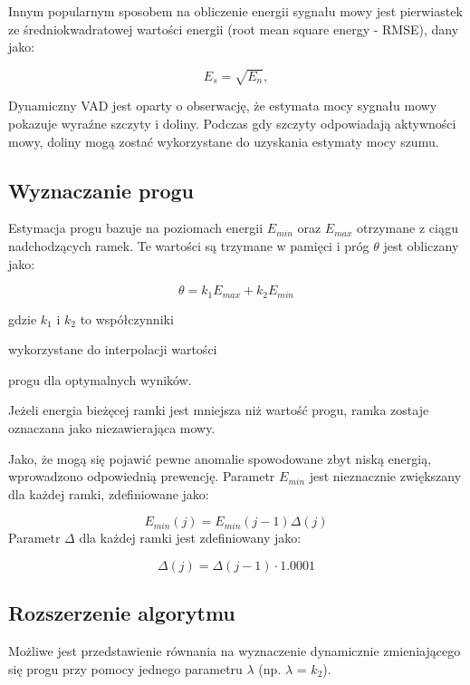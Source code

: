 \documentclass[eng,printmode]{mgr}
\begin{document}
  Innym popularnym sposobem na obliczenie energii sygnału mowy jest pierwiastek ze średniokwadratowej wartości energii (root mean square energy - RMSE), dany jako:
  
  \begin{equation}
	  E_{s} =\sqrt{E_n},
  \end{equation}
  
  Dynamiczny VAD jest oparty o obserwację, że estymata mocy sygnału mowy pokazuje wyraźne szczyty i doliny. Podczas gdy szczyty odpowiadają aktywności mowy, doliny mogą zostać wykorzystane do uzyskania estymaty mocy szumu.
  
  \subsection{Wyznaczanie progu \cite{energyAlgorithm}}
 Estymacja progu bazuje na poziomach energii $E_{min}$ oraz $E_{max}$ otrzymane z ciągu nadchodzących ramek. Te wartości są trzymane w pamięci i próg $\theta$ jest obliczany jako:
 
 \begin{equation}
	 \theta = k_{1}E_{max} + k_{2}E_{min}
 \end{equation}
 
  \hspace{8cm} gdzie $k_{1}$ i $k_{2}$ to współczynniki 
  
  \hspace{8cm}wykorzystane do interpolacji wartości
  
  \hspace{8cm} progu dla optymalnych wyników.\vspace{5mm} 
  
  Jeżeli energia bieżęcej ramki jest mniejsza niż wartość progu, ramka zostaje oznaczana jako niezawierająca mowy. 
  
  Jako, że mogą się pojawić pewne anomalie spowodowane zbyt niską energią, wprowadzono odpowiednią prewencję. Parametr $E_{min}$ jest nieznacznie zwiększany dla każdej ramki, zdefiniowane jako:
  
  \begin{equation}
  E_{min}(j) = E_{min}(j-1)\Delta(j)
  \end{equation}
  Parametr $\Delta$ dla każdej ramki jest zdefiniowany jako:
  
  \begin{equation}
  	\Delta(j) = \Delta(j-1) \cdot1.0001
  \end{equation}
  
  \subsection{Rozszerzenie algorytmu \cite{energyAlgorithm}}
  Możliwe jest przedstawienie równania na wyznaczenie dynamicznie zmieniającego się progu przy pomocy jednego parametru $\lambda$ (np. $\lambda$ = $k_{2}$).
  
\end{document}
